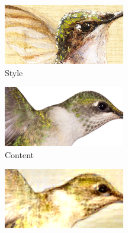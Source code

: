 \begin{figure}[t]
\begin{subfigure}[b]{0.244\textwidth}
  \end{subfigure}
  \par\smallskip
  \begin{subfigure}[b]{0.244\textwidth}
    \includegraphics[width=\textwidth]{gfx/app-content-aware-5}
    \caption{Style}
  \end{subfigure}
  \begin{subfigure}[b]{0.244\textwidth}
    \includegraphics[width=\textwidth]{gfx/app-content-aware-6}
    \caption{Content}
  \end{subfigure}
  \hfill
  \begin{subfigure}[b]{0.244\textwidth}
    \includegraphics[width=\textwidth]{gfx/app-content-aware-7}

\end{subfigure}
\end{figure}
